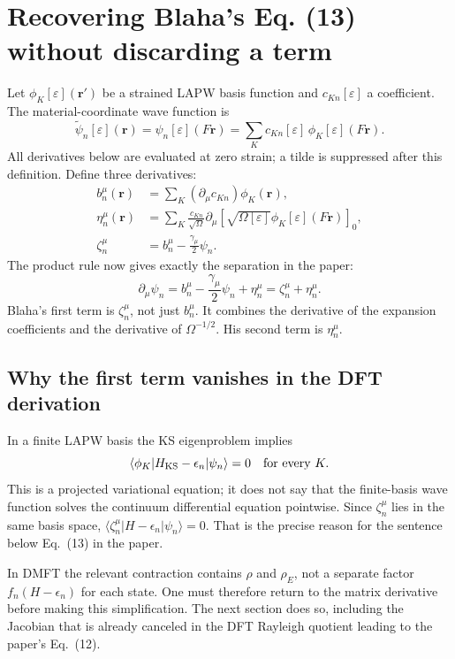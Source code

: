 \documentclass[11pt]{article}
\newcommand{\pa}{\partial_\mu}
\newcommand{\me}[3]{\langle #1|#2|#3\rangle}
\newcommand{\newpart}[1]{\par\Needspace{12\baselineskip}\section{#1}}
\begin{document}
\newpart{Recovering Blaha's Eq. (13) without discarding a term}
\label{sec:eq13}
Let $\phi_K[\varepsilon](\mathbf r')$ be a strained LAPW basis function and
$c_{Kn}[\varepsilon]$ a coefficient. The material-coordinate wave function is
\begin{equation}
 \widetilde\psi_n[\varepsilon](\mathbf r)
 =\psi_n[\varepsilon](F\mathbf r)
 =\sum_K c_{Kn}[\varepsilon]\,
             \phi_K[\varepsilon](F\mathbf r).
\end{equation}
All derivatives below are evaluated at zero strain; a tilde is suppressed
after this definition. Define three derivatives:
\begin{align}
 b_n^\mu(\mathbf r)&=\sum_K(\pa c_{Kn})\phi_K(\mathbf r),
 \label{eq:bdef}\\
 \eta_n^\mu(\mathbf r)&=\sum_K\frac{c_{Kn}}{\sqrt\Omega}
 \pa\!\left[\sqrt{\Omega[\varepsilon]}
           \phi_K[\varepsilon](F\mathbf r)\right]_0,
 \label{eq:etadef}\\
 \zeta_n^\mu&=b_n^\mu-\frac{\gamma_\mu}{2}\psi_n.
\end{align}
The product rule now gives exactly the separation in the paper:
\begin{equation}
 \boxed{\pa\psi_n=b_n^\mu-\frac{\gamma_\mu}{2}\psi_n+\eta_n^\mu
                   =\zeta_n^\mu+\eta_n^\mu.}
 \label{eq:13}
\end{equation}
Blaha's first term is $\zeta_n^\mu$, not just $b_n^\mu$.
It combines the derivative of the expansion coefficients and the derivative
of $\Omega^{-1/2}$. His second term is $\eta_n^\mu$.

\subsection{Why the first term vanishes in the DFT derivation}
In a finite LAPW basis the KS eigenproblem implies
\begin{equation}
 \me{\phi_K}{H_{\rm KS}-\epsilon_n}{\psi_n}=0\quad\hbox{for every }K.
 \label{eq:galerkin}
\end{equation}
This is a projected variational equation; it does not say that the
finite-basis wave function solves the continuum differential equation
pointwise. Since $\zeta_n^\mu$ lies in the same basis space,
$\me{\zeta_n^\mu}{H-\epsilon_n}{\psi_n}=0$.
That is the precise reason for the sentence below Eq.\ (13) in the paper.

In DMFT the relevant contraction contains $\rho$ and $\rho_E$, not a
separate factor $f_n(H-\epsilon_n)$ for each state. One must therefore
return to the matrix derivative before making this simplification.
The next section does so, including the Jacobian that is already canceled
in the DFT Rayleigh quotient leading to the paper's Eq.\ (12).
\end{document}
